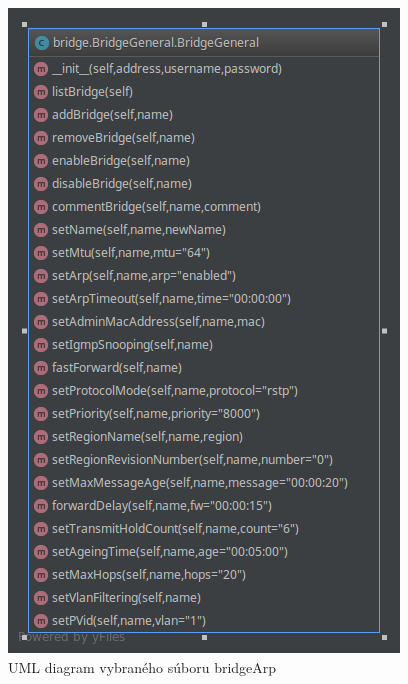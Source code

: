 \begin{figure}[H]
\centering
\includegraphics[scale=0.48]{../text/bridge.png}
\caption{UML diagram vybraného súboru bridgeArp}
\label{fig:bridge}
\end{figure}

